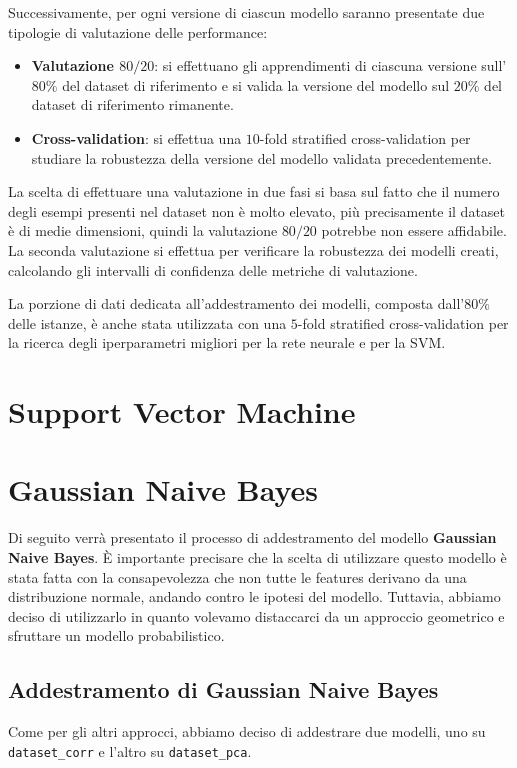 Successivamente, per ogni versione di ciascun modello saranno presentate due
tipologie di valutazione delle performance:
\begin{itemize}
    \item \textbf{Valutazione $80/20$}: si effettuano gli apprendimenti di
          ciascuna versione sull'$80\%$ del dataset di riferimento e si valida
          la versione del modello sul $20\%$ del dataset di riferimento rimanente.
    \item \textbf{Cross-validation}: si effettua una $10$-fold stratified
          cross-validation per studiare la robustezza della versione del modello
          validata precedentemente.
\end{itemize}
La scelta di effettuare una valutazione in due fasi si basa sul fatto che il
numero degli esempi presenti nel dataset non è molto elevato, più precisamente
il dataset è di medie dimensioni, quindi la valutazione $80/20$ potrebbe non
essere affidabile. La seconda valutazione si effettua per verificare la
robustezza dei modelli creati, calcolando gli intervalli di confidenza delle
metriche di valutazione.

La porzione di dati dedicata all'addestramento dei modelli, composta dall'$80\%$ 
delle istanze, è anche stata utilizzata con una $5$-fold stratified cross-validation 
per la ricerca degli iperparametri migliori per la rete neurale e per la SVM.
\section{Support Vector Machine}
\section{Gaussian Naive Bayes}
Di seguito verrà presentato il processo di addestramento del modello
\textbf{Gaussian Naive Bayes}. È importante precisare che la scelta di utilizzare
questo modello è stata fatta con la consapevolezza che non tutte le features
derivano da una distribuzione normale, andando contro le ipotesi del modello.
Tuttavia, abbiamo deciso di utilizzarlo in quanto volevamo distaccarci da un
approccio geometrico e sfruttare un modello probabilistico.
\subsection{Addestramento di Gaussian Naive Bayes}
Come per gli altri approcci, abbiamo deciso di addestrare due modelli, uno su
\texttt{dataset\_corr} e l'altro su \texttt{dataset\_pca}.

